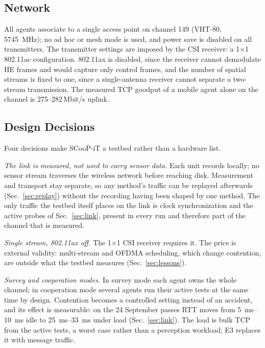 \subsection{Network}
All agents associate to a single access point on channel 149 (VHT-80,
\SI{5745}{\mega\hertz}); no ad hoc or mesh mode is used, and power
save is disabled on all transmitters. The transmitter settings are
imposed by the CSI receiver: a 1$\times$1 802.11ac configuration.
802.11ax is disabled, since the receiver cannot demodulate HE frames
and would capture only control frames, and the number of spatial
streams is fixed to one, since a single-antenna receiver cannot
separate a two-stream transmission. The measured TCP goodput of a mobile agent alone on the channel is
\numrange{275}{282}\,Mbit/s uplink. 

\subsection{Design Decisions}
\label{sec:decisions}
Four decisions make SCooP-iT a testbed rather than a hardware list.

\emph{The link is measured, not used to carry sensor data.} Each unit
records locally; no sensor stream traverses the wireless network
before reaching disk. Measurement and transport stay separate, so any
method's traffic can be replayed afterwards (Sec.~\ref{sec:replay})
without the recording having been shaped by one method. The only
traffic the testbed itself places on the link is clock synchronization
and the active probes of Sec.~\ref{sec:link}, present in every run and
therefore part of the channel that is measured.

\emph{Single stream, 802.11ax off.} The 1$\times$1 CSI receiver
requires it. The price is external validity: multi-stream and OFDMA
scheduling, which change contention, are outside what the testbed
measures (Sec.~\ref{sec:lessons}).

\emph{Survey and cooperation modes.} In survey mode each agent owns
the whole channel; in cooperation mode several agents run their active
tests at the same time by design. Contention becomes a controlled setting
instead of an accident, and its effect is measurable: on the 24
September passes RTT moves from \SIrange{5}{10}{\milli\second} idle to
\SIrange{25}{33}{\milli\second} under load (Sec.~\ref{sec:link}). The
load is bulk TCP from the active tests, a worst case rather than a
perception workload; E3 replaces it with message traffic.

